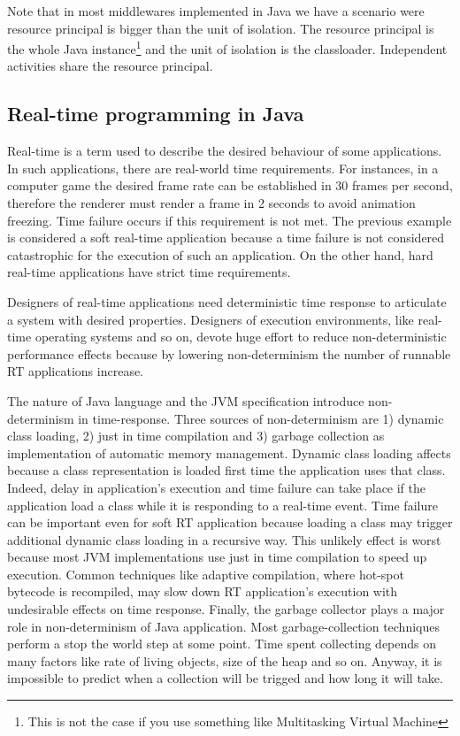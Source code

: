 Note that in most middlewares implemented in Java we have a scenario were resource principal is bigger than the unit of isolation.
The resource principal is the whole Java instance\footnote{This is not the case if you use something like Multitasking Virtual Machine} and the unit of isolation is the classloader. Independent activities share the resource principal.

\subsection{Real-time programming in Java}
Real-time is a term used to describe the desired behaviour of some applications.
In such applications, there are real-world time requirements.
For instances, in a computer game the desired frame rate can be established in 30 frames per second, therefore the renderer must render a frame in 2 seconds to avoid animation freezing.
Time failure occurs if this requirement is not met.
The previous example is considered a soft real-time application because a time failure is not considered catastrophic for the execution of such an application.
On the other hand, hard real-time applications have strict time requirements.

Designers of real-time applications need deterministic time response to articulate a system with desired properties.
Designers of execution environments, like real-time operating systems and so on, devote huge effort to reduce non-deterministic performance effects because by lowering non-determinism the number of runnable RT applications increase.

The nature of Java language and the JVM specification introduce non-determinism in time-response.
Three sources of non-determinism are 1) dynamic class loading, 2) just in time compilation and 3) garbage collection as implementation of automatic memory management.
Dynamic class loading affects because a class representation is loaded first time the application uses that class.
Indeed, delay in application's execution and time failure can take place if the application load a class while it is responding to a real-time event.
Time failure can be important even for soft RT application because loading a class may trigger additional dynamic class loading in a recursive way.
This unlikely effect is worst because most JVM implementations use just in time compilation to speed up execution.
Common techniques like adaptive compilation, where hot-spot bytecode is recompiled, may slow down RT application's execution with undesirable effects on time response.
Finally, the garbage collector plays a major role in non-determinism of Java application.
Most garbage-collection techniques perform a stop the world step at some point.
Time spent collecting depends on many factors like rate of living objects, size of the heap and so on. Anyway, it is impossible to predict when a collection will be trigged and how long it will take.

